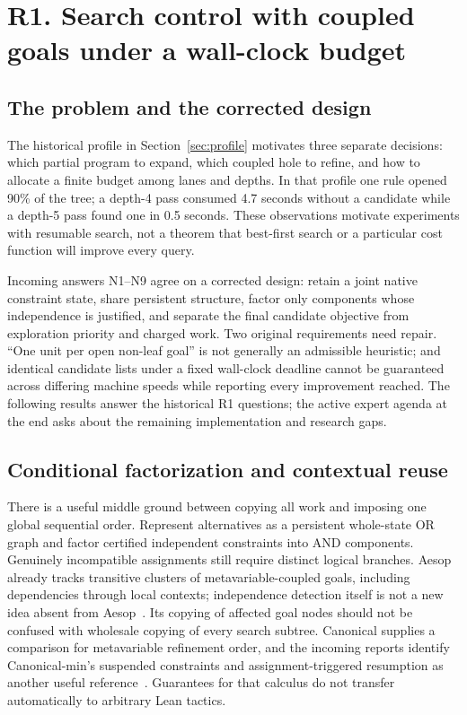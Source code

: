 \section{R1. Search control with coupled goals under a wall-clock budget}\label{sec:search}

\subsection{The problem and the corrected design}

The historical profile in Section~\ref{sec:profile} motivates three separate
decisions: which partial program to expand, which coupled hole to refine, and
how to allocate a finite budget among lanes and depths. In that profile one
rule opened 90\% of the tree; a depth-4 pass consumed 4.7 seconds without a
candidate while a depth-5 pass found one in 0.5 seconds. These observations
motivate experiments with resumable search, not a theorem that best-first
search or a particular cost function will improve every query.

Incoming answers N1--N9 agree on a corrected design: retain a joint native
constraint state, share persistent structure, factor only components whose
independence is justified, and separate the final candidate objective from
exploration priority and charged work. Two original requirements need repair.
``One unit per open non-leaf goal'' is not generally an admissible heuristic;
and identical candidate lists under a fixed wall-clock deadline cannot be
guaranteed across differing machine speeds while reporting every improvement
reached. The following results answer the historical R1 questions; the active
expert agenda at the end asks about the remaining implementation and research gaps.

\subsection{Conditional factorization and contextual reuse}
\label{sec:search-factorization}

There is a useful middle ground between copying all work and imposing one
global sequential order. Represent alternatives as a persistent whole-state
OR graph and factor certified independent constraints into AND components.
Genuinely incompatible assignments still require distinct logical branches.
Aesop already tracks transitive clusters of metavariable-coupled goals,
including dependencies through local contexts; independence detection itself
is not a new idea absent from Aesop~\cite{aesop}. Its copying of affected goal
nodes should not be confused with wholesale copying of every search subtree.
Canonical supplies a comparison for metavariable refinement order, and the
incoming reports identify Canonical-min's suspended constraints and
assignment-triggered resumption as another useful reference~\cite{canonicalmin}. Guarantees for
that calculus do not transfer automatically to arbitrary Lean tactics.

